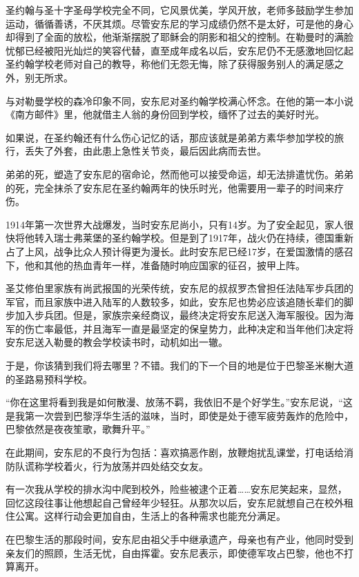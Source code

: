 圣约翰与圣十字圣母学校完全不同，它风景优美，学风开放，老师多鼓励学生参加运动，循循善诱，不厌其烦。尽管安东尼的学习成绩仍然不是太好，可是他的身心却得到了全面的放松，他渐渐摆脱了耶稣会的阴影和祖父的控制。在勒曼时的满脸忧郁已经被阳光灿烂的笑容代替，直至成年成名以后，安东尼仍不无感激地回忆起圣约翰学校老师对自己的教导，称他们无怨无悔，除了获得服务别人的满足感之外，别无所求。

与对勒曼学校的森冷印象不同，安东尼对圣约翰学校满心怀念。在他的第一本小说《南方邮件》里，他就借主人翁的身份回到学校，缅怀了过去的美好时光。

如果说，在圣约翰还有什么伤心记忆的话，那应该就是弟弟方素华参加学校的旅行，丢失了外套，由此患上急性关节炎，最后因此病而去世。

弟弟的死，塑造了安东尼的宿命论，然而他可以接受命运，却无法排遣忧伤。弟弟的死，完全抹杀了安东尼在圣约翰两年的快乐时光，他需要用一辈子的时间来疗伤。


\stoptitle

\starttitle[title={5}]

1914年第一次世界大战爆发，当时安东尼尚小，只有14岁。为了安全起见，家人很快将他转入瑞士弗莱堡的圣约翰学校。但是到了1917年，战火仍在持续，德国重新占了上风，战争比众人预计得更为漫长。此时安东尼已经17岁，在爱国激情的感召下，他和其他的热血青年一样，准备随时响应国家的征召，披甲上阵。

圣艾修伯里家族有尚武报国的光荣传统，安东尼的叔叔罗杰曾担任法陆军步兵团的军官，而且家族中进入陆军的人数较多，如此，安东尼也势必应该追随长辈们的脚步加入步兵团。但是，家族宗亲经商议，最终决定将安东尼送入海军服役。因为海军的伤亡率最低，并且海军一直是最坚定的保皇势力，此种决定和当年他们决定将安东尼送入勒曼的教会学校读书时，动机如出一辙。

于是，你该猜到我们将去哪里？不错。我们的下一个目的地是位于巴黎圣米榭大道的圣路易预科学校。

“你在这里将看到我是如何散漫、放荡不羁，我依旧不是个好学生。”安东尼说，“这是我第一次尝到巴黎浮华生活的滋味，当时，即使是处于德军疲劳轰炸的危险中，巴黎依然是夜夜笙歌，歌舞升平。”

在此期间，安东尼的不良行为包括：喜欢搞恶作剧，放鞭炮扰乱课堂，打电话给消防队谎称学校着火，行为放荡并四处结交女友。

有一次我从学校的排水沟中爬到校外，险些被逮个正着\ldots{}\ldots{}安东尼笑起来，显然，回忆这段往事让他想起自己曾经年少轻狂。从那次以后，安东尼就想自己在校外租住公寓。这样行动会更加自由，生活上的各种需求也能充分满足。

在巴黎生活的那段时间，安东尼由祖父手中继承遗产，母亲也有产业，他同时受到亲友们的照顾，生活无忧，自由挥霍。安东尼表示，即使德军攻占巴黎，他也不打算离开。

